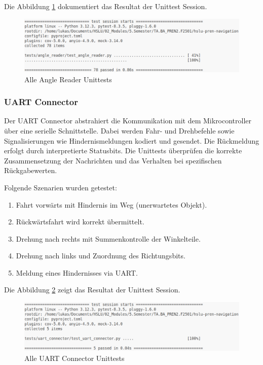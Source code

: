 Die Abbildung \ref{fig:angle-reader-unittests} dokumentiert das Resultat der Unittest Session.

\begin{figure}[H]
\centering
\includegraphics[width=\textwidth]{assets/IT/testing/unittests/angle_reader_unittests_result.png}
\caption{Alle Angle Reader Unittests}
\label{fig:angle-reader-unittests}
\end{figure}


\newpage
\subsubsection*{UART Connector}\label{uart-connector-unittests}

Der UART Connector abstrahiert die Kommunikation mit dem Mikrocontroller über eine serielle Schnittstelle. Dabei werden Fahr- und Drehbefehle sowie Signalisierungen wie Hindernismeldungen kodiert und gesendet. Die Rückmeldung erfolgt durch interpretierte Statusbits. Die Unittests überprüfen die korrekte Zusammensetzung der Nachrichten und das Verhalten bei spezifischen Rückgabewerten.

Folgende Szenarien wurden getestet:

\begin{enumerate}
\item Fahrt vorwärts mit Hindernis im Weg (unerwartetes Objekt).
\item Rückwärtsfahrt wird korrekt übermittelt.
\item Drehung nach rechts mit Summenkontrolle der Winkelteile.
\item Drehung nach links und Zuordnung des Richtungsbits.
\item Meldung eines Hindernisses via UART.
\end{enumerate}

Die Abbildung \ref{fig:uart-connector-unittests} zeigt das Resultat der Unittest Session.

\begin{figure}[H]
\centering
\includegraphics[width=\textwidth]{assets/IT/testing/unittests/uart_connector_unittests_result.png}
\caption{Alle UART Connector Unittests}
\label{fig:uart-connector-unittests}
\end{figure}


